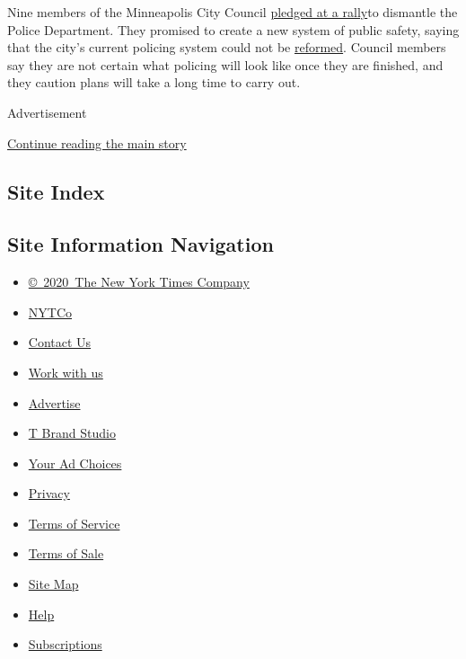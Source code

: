Nine members of the Minneapolis City Council
\href{https://www.nytimes3xbfgragh.onion/2020/06/07/us/minneapolis-police-abolish.html}{pledged
at a rally}to dismantle the Police Department. They promised to create a
new system of public safety, saying that the city's current policing
system could not be
\href{https://www.nytimes3xbfgragh.onion/2020/06/11/world/police-brutality-protests.html}{reformed}.
Council members say they are not certain what policing will look like
once they are finished, and they caution plans will take a long time to
carry out.

Advertisement

\protect\hyperlink{after-bottom}{Continue reading the main story}

\hypertarget{site-index}{%
\subsection{Site Index}\label{site-index}}

\hypertarget{site-information-navigation}{%
\subsection{Site Information
Navigation}\label{site-information-navigation}}

\begin{itemize}
\tightlist
\item
  \href{https://help.nytimes3xbfgragh.onion/hc/en-us/articles/115014792127-Copyright-notice}{©~2020~The
  New York Times Company}
\end{itemize}

\begin{itemize}
\tightlist
\item
  \href{https://www.nytco.com/}{NYTCo}
\item
  \href{https://help.nytimes3xbfgragh.onion/hc/en-us/articles/115015385887-Contact-Us}{Contact
  Us}
\item
  \href{https://www.nytco.com/careers/}{Work with us}
\item
  \href{https://nytmediakit.com/}{Advertise}
\item
  \href{http://www.tbrandstudio.com/}{T Brand Studio}
\item
  \href{https://www.nytimes3xbfgragh.onion/privacy/cookie-policy\#how-do-i-manage-trackers}{Your
  Ad Choices}
\item
  \href{https://www.nytimes3xbfgragh.onion/privacy}{Privacy}
\item
  \href{https://help.nytimes3xbfgragh.onion/hc/en-us/articles/115014893428-Terms-of-service}{Terms
  of Service}
\item
  \href{https://help.nytimes3xbfgragh.onion/hc/en-us/articles/115014893968-Terms-of-sale}{Terms
  of Sale}
\item
  \href{https://spiderbites.nytimes3xbfgragh.onion}{Site Map}
\item
  \href{https://help.nytimes3xbfgragh.onion/hc/en-us}{Help}
\item
  \href{https://www.nytimes3xbfgragh.onion/subscription?campaignId=37WXW}{Subscriptions}
\end{itemize}

